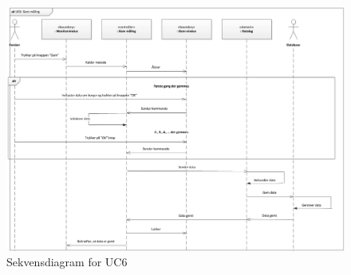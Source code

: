 \begin{figure}[H]
	\centering
	\includegraphics[width=1\textwidth]{Figurer/Snip20151102_14}
	\caption{Sekvensdiagram for UC6}
\end{figure}












